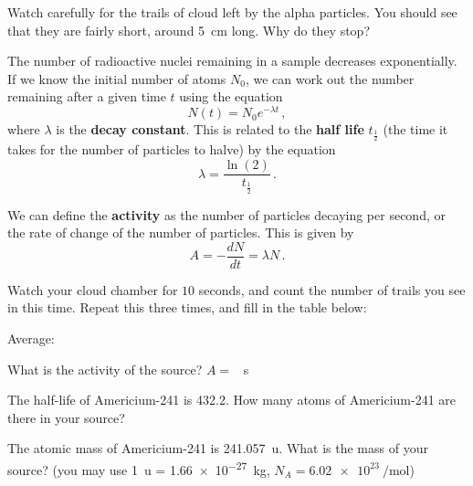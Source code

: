 \documentclass{article}
\newcommand{\important}[1]{\textbf{#1}}
\begin{document}
\task{}

\question{}
Watch carefully for the trails of cloud left by the alpha particles. You should
see that they are fairly short, around \SI{5}{\centi\metre} long. Why do they stop?

\answertext{}

\question{}

The number of radioactive nuclei remaining in a sample decreases exponentially. If we know the initial number of atoms $N_0$, we can work out the number remaining after a given time $t$ using the equation
\begin{equation*}
    N(t) = N_0 e^{-\lambda t}\,,
\end{equation*}
where $\lambda$ is the \important{decay constant}. This is related to the \important{half life} $t_{\frac{1}{2}}$ (the time it takes for the number of particles to halve) by the equation
\begin{equation*}
    \lambda = \frac{\ln (2)}{t_{\frac{1}{2}}}\,.
\end{equation*}

We can define the \important{activity} as the number of particles decaying per second, or the rate of change of the number of particles. This is given by
\begin{equation*}
    A = -\frac{dN}{dt} = \lambda N\,.
\end{equation*}

Watch your cloud chamber for $10$ seconds, and count the number of trails you see in this time. Repeat this three times, and fill in the table below:


Average: 

What is the activity of the source? $A = $  \si{\per\second}

\question{}

The half-life of Americium-241 is \SI{432.2}{\year}. How many atoms of Americium-241 are there in your source? 

\answertext[prompt = {$N = $}, answer ={ $\sim10^{25}$}]{}

The atomic mass of Americium-241 is \SI{241.057}{\atomicmassunit}. What is the mass of your source? (you may use \SI{1}{\atomicmassunit} = \SI{1.66e-27}{\kilo\gram}, $N_A = \SI{6.02e23}{\per\mole}$)

\answertext[prompt = {$m = $}, answer = {$\sim 1$}, unit = \si{\gram}]{}

\end{document}

